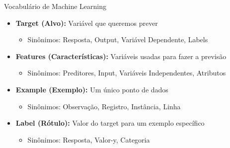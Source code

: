 \documentclass[xcolor=dvipsnames,t,aspectratio=169]{beamer} %
\begin{document}
\begin{frame}[c]{Vocabulário de Machine Learning}
    \begin{itemize}
        \item \textbf{Target (Alvo):} Variável que queremos prever
        \begin{itemize}
            \item Sinônimos: Resposta, Output, Variável Dependente, Labels
        \end{itemize}
        
        \item \textbf{Features (Características):} Variáveis usadas para fazer a previsão
        \begin{itemize}
            \item Sinônimos: Preditores, Input, Variáveis Independentes, Atributos
        \end{itemize}
        
        \item \textbf{Example (Exemplo):} Um único ponto de dados
        \begin{itemize}
            \item Sinônimos: Observação, Registro, Instância, Linha
        \end{itemize}
        
        \item \textbf{Label (Rótulo):} Valor do target para um exemplo específico
        \begin{itemize}
            \item Sinônimos: Resposta, Valor-y, Categoria
        \end{itemize}
    \end{itemize}
\end{frame}
\end{document}
